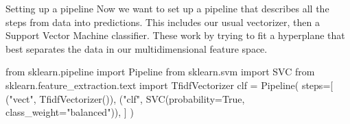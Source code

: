 \documentclass[
  10pt,
  ignorenonframetext,
  aspectratio=169]{beamer}
\newenvironment{Shaded}{\begin{snugshade}}{\end{snugshade}}
\newcommand{\ImportTok}[1]{\textcolor[rgb]{0.80,0.80,0.80}{#1}}
\newcommand{\NormalTok}[1]{\textcolor[rgb]{0.80,0.80,0.80}{#1}}
\newcommand{\OperatorTok}[1]{\textcolor[rgb]{0.94,0.94,0.82}{#1}}
\newcommand{\StringTok}[1]{\textcolor[rgb]{0.80,0.58,0.58}{#1}}
\newcommand{\VariableTok}[1]{\textcolor[rgb]{0.80,0.80,0.80}{#1}}
\begin{document}
\begin{frame}[fragile]{Setting up a pipeline}
\protect\hypertarget{setting-up-a-pipeline}{}
Now we want to set up a pipeline that describes all the steps from data
into predictions. This includes our usual vectorizer, then a Support
Vector Machine classifier. These work by trying to fit a hyperplane that
best separates the data in our multidimensional feature space.

\medskip
\scriptsize

\begin{Shaded}
\begin{Highlighting}[]
\ImportTok{from}\NormalTok{ sklearn.pipeline }\ImportTok{import}\NormalTok{ Pipeline}
\ImportTok{from}\NormalTok{ sklearn.svm }\ImportTok{import}\NormalTok{ SVC}
\ImportTok{from}\NormalTok{ sklearn.feature\_extraction.text }\ImportTok{import}\NormalTok{ TfidfVectorizer}
\NormalTok{clf }\OperatorTok{=}\NormalTok{ Pipeline(}
\NormalTok{    steps}\OperatorTok{=}\NormalTok{[}
\NormalTok{        (}\StringTok{"vect"}\NormalTok{, TfidfVectorizer()),}
\NormalTok{        (}\StringTok{"clf"}\NormalTok{, SVC(probability}\OperatorTok{=}\VariableTok{True}\NormalTok{, class\_weight}\OperatorTok{=}\StringTok{"balanced"}\NormalTok{)),}
\NormalTok{    ]}
\NormalTok{)}
\end{Highlighting}
\end{Shaded}
\end{frame}
\end{document}
